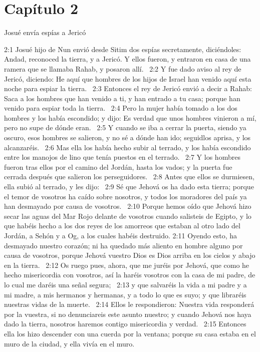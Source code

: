 \section*{Capítulo 2}
Josué envía espías a Jericó  

2:1 Josué hijo de Nun envió desde Sitim dos espías secretamente, diciéndoles: Andad, reconoced la tierra, y a Jericó. Y ellos fueron, y entraron en casa de una ramera que se llamaba Rahab, y posaron allí.  
2:2 Y fue dado aviso al rey de Jericó, diciendo: He aquí que hombres de los hijos de Israel han venido aquí esta noche para espiar la tierra.  
2:3 Entonces el rey de Jericó envió a decir a Rahab: Saca a los hombres que han venido a ti, y han entrado a tu casa; porque han venido para espiar toda la tierra.  
2:4 Pero la mujer había tomado a los dos hombres y los había escondido; y dijo: Es verdad que unos hombres vinieron a mí, pero no supe de dónde eran.  
2:5 Y cuando se iba a cerrar la puerta, siendo ya oscuro, esos hombres se salieron, y no sé a dónde han ido; seguidlos aprisa, y los alcanzaréis.  
2:6 Mas ella los había hecho subir al terrado, y los había escondido entre los manojos de lino que tenía puestos en el terrado.  
2:7 Y los hombres fueron tras ellos por el camino del Jordán, hasta los vados; y la puerta fue cerrada después que salieron los perseguidores.  
2:8 Antes que ellos se durmiesen, ella subió al terrado, y les dijo:  
2:9 Sé que Jehová os ha dado esta tierra; porque el temor de vosotros ha caído sobre nosotros, y todos los moradores del país ya han desmayado por causa de vosotros.  
2:10 Porque hemos oído que Jehová hizo secar las aguas del Mar Rojo delante de vosotros cuando salisteis de Egipto, y lo que habéis hecho a los dos reyes de los amorreos que estaban al otro lado del Jordán, a Sehón y a Og, a los cuales habéis destruido. 
2:11 Oyendo esto, ha desmayado nuestro corazón; ni ha quedado más aliento en hombre alguno por causa de vosotros, porque Jehová vuestro Dios es Dios arriba en los cielos y abajo en la tierra.  
2:12 Os ruego pues, ahora, que me juréis por Jehová, que como he hecho misericordia con vosotros, así la haréis vosotros con la casa de mi padre, de lo cual me daréis una señal segura;  
2:13 y que salvaréis la vida a mi padre y a mi madre, a mis hermanos y hermanas, y a todo lo que es suyo; y que libraréis nuestras vidas de la muerte.  
2:14 Ellos le respondieron: Nuestra vida responderá por la vuestra, si no denunciareis este asunto nuestro; y cuando Jehová nos haya dado la tierra, nosotros haremos contigo misericordia y verdad.  
2:15 Entonces ella los hizo descender con una cuerda por la ventana; porque su casa estaba en el muro de la ciudad, y ella vivía en el muro.  
